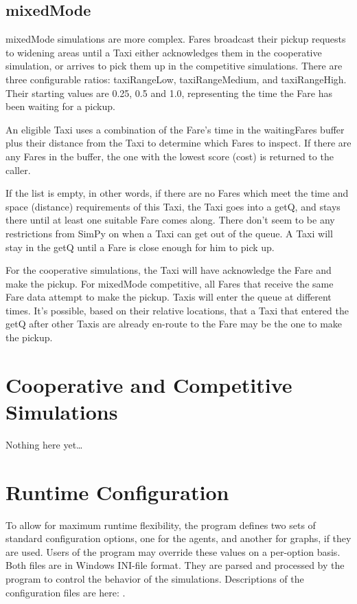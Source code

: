 \documentclass[11pt,letterpaper,onecolumn,twoside,openright,final]{report}
\begin{document}
\subsection{mixedMode}
mixedMode simulations are more complex.
Fares broadcast their pickup requests to widening areas until a Taxi either acknowledges them in the cooperative simulation, or arrives to pick them up in the competitive simulations.
There are three configurable ratios: taxiRangeLow, taxiRangeMedium, and taxiRangeHigh.
Their starting values are 0.25, 0.5 and 1.0, representing the time the Fare has been waiting for a pickup.

An eligible Taxi uses a combination of the Fare's time in the waitingFares buffer plus their distance from the Taxi to determine which Fares to inspect.
If there are any Fares in the buffer, the one with the lowest score (cost) is returned to the caller.

If the list is empty, in other words, if there are no Fares which meet the time and space (distance) requirements of this Taxi, the Taxi goes into a getQ, and stays there until at least one suitable Fare comes along.
There don't seem to be any restrictions from SimPy on when a Taxi can get out of the queue.
A Taxi will stay in the getQ until a Fare is close enough for him to pick up.

For the cooperative simulations, the Taxi will have acknowledge the Fare and make the pickup.
For mixedMode competitive, all Fares that receive the same Fare data attempt to make the pickup.
Taxis will enter the queue at different times.
It's possible, based on their relative locations, that a Taxi that entered the getQ after other Taxis are already en-route to the Fare may be the one to make the pickup.

\section{Cooperative and Competitive Simulations}
Nothing here yet\ldots

\section{Runtime Configuration}
To allow for maximum runtime flexibility, the program defines two sets of standard configuration options, one for the agents, and another for graphs, if they are used.
Users of the program may override these values on a per-option basis.
Both files are in Windows INI-file format.
They are parsed and processed by the program to control the behavior of the simulations.
Descriptions of the configuration files are here: .
\end{document}
